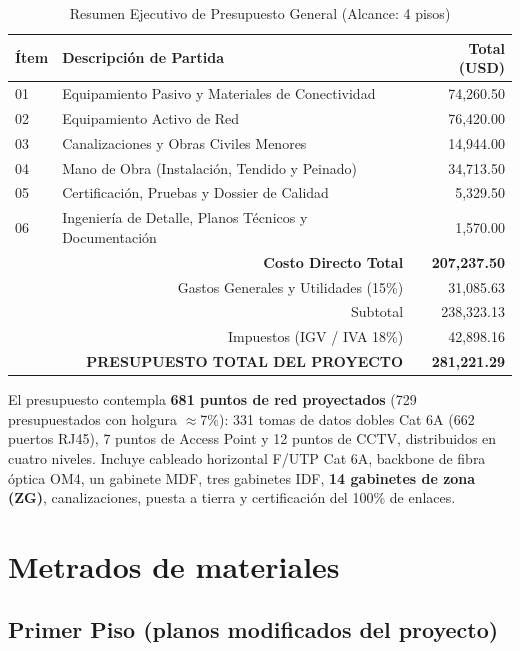 \begin{table}[H]
\centering
\caption{Resumen Ejecutivo de Presupuesto General (Alcance: 4 pisos)}
\begin{tabular}{|l|l|r|}
\hline
\textbf{Ítem} & \textbf{Descripción de Partida} & \textbf{Total (USD)} \\ \hline
01 & Equipamiento Pasivo y Materiales de Conectividad & 74,260.50 \\ \hline
02 & Equipamiento Activo de Red & 76,420.00 \\ \hline
03 & Canalizaciones y Obras Civiles Menores & 14,944.00 \\ \hline
04 & Mano de Obra (Instalación, Tendido y Peinado) & 34,713.50 \\ \hline
05 & Certificación, Pruebas y Dossier de Calidad & 5,329.50 \\ \hline
06 & Ingeniería de Detalle, Planos Técnicos y Documentación & 1,570.00 \\ \hline
\multicolumn{2}{|r|}{\textbf{Costo Directo Total}} & \textbf{207,237.50} \\ \hline
\multicolumn{2}{|r|}{Gastos Generales y Utilidades (15\%)} & 31,085.63 \\ \hline
\multicolumn{2}{|r|}{Subtotal} & 238,323.13 \\ \hline
\multicolumn{2}{|r|}{Impuestos (IGV / IVA 18\%)} & 42,898.16 \\ \hline
\multicolumn{2}{|r|}{\textbf{PRESUPUESTO TOTAL DEL PROYECTO}} & \textbf{281,221.29} \\ \hline
\end{tabular}
\end{table}

El presupuesto contempla \textbf{681 puntos de red proyectados} (729 presupuestados con holgura $\approx$7\%): 331 tomas de datos dobles Cat 6A (662 puertos RJ45), 7 puntos de Access Point y 12 puntos de CCTV, distribuidos en cuatro niveles. Incluye cableado horizontal F/UTP Cat 6A, backbone de fibra óptica OM4, un gabinete MDF, tres gabinetes IDF, \textbf{14 gabinetes de zona (ZG)}, canalizaciones, puesta a tierra y certificación del 100\% de enlaces.

\section{Metrados de materiales}

\subsection*{Primer Piso (planos modificados del proyecto)}

